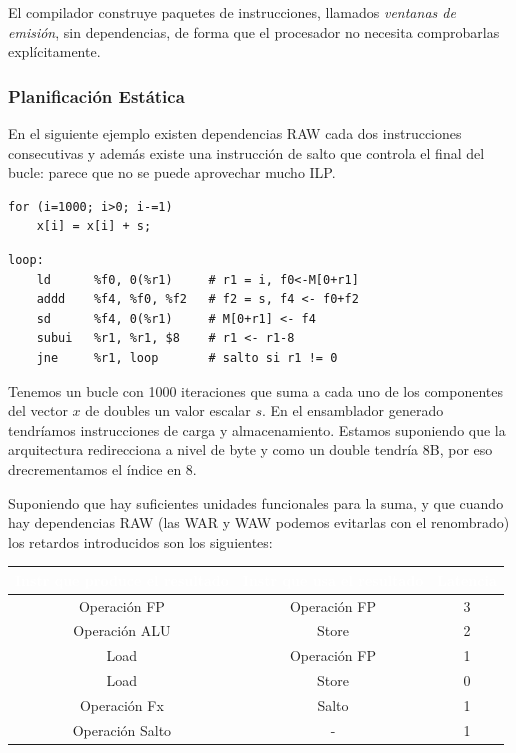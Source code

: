 \documentclass[10pt,a4paper,spanish]{report}
\begin{document}
El compilador construye paquetes de instrucciones, llamados \textit{\textcolor{azul}{ventanas de emisión}}, sin dependencias, de forma que el procesador no necesita comprobarlas explícitamente.

\textcolor{azul}{\subsubsection{Planificación Estática}}
En el siguiente ejemplo existen dependencias RAW cada dos instrucciones consecutivas y además existe una instrucción de salto que controla el final del bucle: parece que no se puede aprovechar mucho ILP.

\begin{minipage}{0.35\textwidth}
\begin{verbatim}
for (i=1000; i>0; i-=1)
    x[i] = x[i] + s;
\end{verbatim}
\end{minipage}
\begin{minipage}{0.65\textwidth}
\begin{verbatim}
loop:
    ld      %f0, 0(%r1)     # r1 = i, f0<-M[0+r1]
    addd    %f4, %f0, %f2   # f2 = s, f4 <- f0+f2
    sd      %f4, 0(%r1)     # M[0+r1] <- f4
    subui   %r1, %r1, $8    # r1 <- r1-8
    jne     %r1, loop       # salto si r1 != 0
\end{verbatim}
\end{minipage}

Tenemos un bucle con 1000 iteraciones que suma a cada uno de los componentes del vector $x$ de doubles un valor escalar $s$. En el ensamblador generado tendríamos instrucciones de carga y almacenamiento. Estamos suponiendo que la arquitectura redirecciona a nivel de byte y como un double tendría 8B, por eso drecrementamos el índice en 8.

Suponiendo que hay suficientes unidades funcionales para la suma, y que cuando hay dependencias RAW (las WAR y WAW podemos evitarlas con el renombrado) los retardos introducidos son los siguientes:

\begin{center}
{
\begin{tabular}{|c | c | c|}
\hline
\rowcolor[rgb]{0.7,0.11,0.11} \textcolor{white}{Instr que produce el resultado} & \textcolor{white}{Instr que usa el resultado} & \textcolor{white}{Latencia} \\
\hline
Operación FP & Operación FP & 3 \\
Operación ALU & Store & 2 \\
Load & Operación FP & 1 \\
Load & Store & 0 \\
Operación Fx & Salto & 1 \\
Operación Salto & - & 1 \\
\hline
\end{tabular}
}
\end{center}
\end{document}
